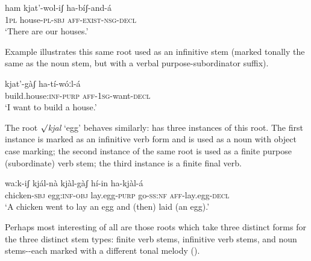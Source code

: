 \documentclass[output=paper]{langsci/langscibook}
\begin{document}
\ex\label{ex:mahland:17}
\gll ham   kjat'-wol-iʃ       ha-bíʃ-and-á\\
\textsc{1pl}    house-\textsc{pl-sbj}    \textsc{aff-exist-nsg-decl} \\
\glt `There are our houses.'
\z

Example  illustrates this same root used as an infinitive stem (marked tonally the same as the noun stem, but with a verbal purpose-subordinator suffix).

\ea\label{ex:mahland:18}
\gll kjat'-gàʃ                    ha-tí-wóːl-{\downstep}á\\
build.house:\textsc{inf-purp}   \textsc{aff-1sg}{}-want-\textsc{decl} \\
\glt `I want to build a house.'
\z

The root \textit{${\surd}$kjal} `egg' behaves similarly:  has three instances of this root. The first instance is marked as an infinitive verb form and is used as a noun with object case marking; the second instance of the same root is used as a finite purpose (subordinate) verb stem; the third instance is a finite final verb. 

\ea\label{ex:mahland:19}
\gll waːk-iʃ          kjál-nà         kjàl-gàʃ         hí-in    ha-kjàl-á
   \\
chicken-\textsc{sbj}   egg:\textsc{inf-obj}   lay.egg\textsc{{}-purp}  go\textsc{{}-ss:nf} \textsc{aff}{}-lay.egg-\textsc{decl} \\
\glt `A chicken went to lay an egg and (then) laid (an egg).'
\z

Perhaps most interesting of all are those roots which take three distinct forms for the three distinct stem types: finite verb stems, infinitive verb stems, and noun stems-{}-each marked with a different tonal melody ().
\end{document}
